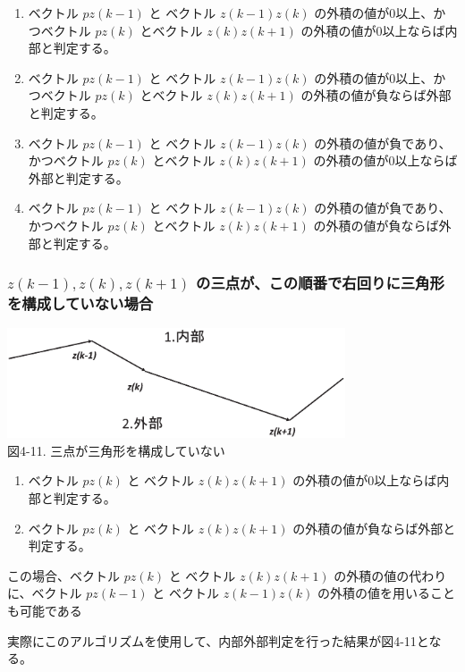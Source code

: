 \begin{enumerate}
 \item ベクトル $p z(k-1)$ と ベクトル $z(k-1) z(k)$ の外積の値が0以上、かつベクトル $p z(k)$ とベクトル $z(k) z(k+1)$ の外積の値が0以上ならば内部と判定する。
 \item ベクトル $p z(k-1)$ と ベクトル $z(k-1) z(k)$ の外積の値が0以上、かつベクトル $p z(k)$ とベクトル $z(k) z(k+1)$ の外積の値が負ならば外部と判定する。
 \item ベクトル $p z(k-1)$ と ベクトル $z(k-1) z(k)$ の外積の値が負であり、かつベクトル $p z(k)$ とベクトル $z(k) z(k+1)$ の外積の値が0以上ならば外部と判定する。
 \item ベクトル $p z(k-1)$ と ベクトル $z(k-1) z(k)$ の外積の値が負であり、かつベクトル $p z(k)$ とベクトル $z(k) z(k+1)$ の外積の値が負ならば外部と判定する。
\end{enumerate}

\subsubsection{$z(k-1),z(k),z(k+1)$ の三点が、この順番で右回りに三角形を構成していない場合}

\begin{center}
  \includegraphics[width=10cm]{sen_vec.eps} \\
 \vspace{-1mm}
  図4-11. 三点が三角形を構成していない
\end{center}

\begin{enumerate}
 \item ベクトル $p z(k)$ と ベクトル $z(k) z(k+1)$ の外積の値が0以上ならば内部と判定する。
 \item ベクトル $p z(k)$ と ベクトル $z(k) z(k+1)$ の外積の値が負ならば外部と判定する。
\end{enumerate}
この場合、ベクトル $p z(k)$ と ベクトル $z(k) z(k+1)$ の外積の値の代わりに、ベクトル $p z(k-1)$ と ベクトル $z(k-1) z(k)$ の外積の値を用いることも可能である

実際にこのアルゴリズムを使用して、内部外部判定を行った結果が図4-11となる。


